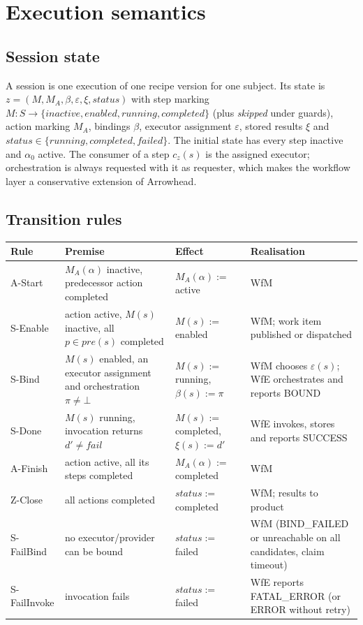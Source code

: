 \documentclass[a4paper]{arrowhead}
\begin{document}
\section{Execution semantics}
\label{sec:semantics}
\subsection{Session state}
A session is one execution of one recipe version for one subject. Its state is
$z = (M, M_A, \beta, \varepsilon, \xi, status)$ with step marking $M: S \rightarrow \{inactive, enabled, running,
completed\}$ (plus \emph{skipped} under guards), action marking $M_A$, bindings $\beta$, executor assignment
$\varepsilon$, stored results $\xi$ and $status \in \{running, completed, failed\}$. The initial state has every step
inactive and $\alpha_0$ active. The consumer of a step $c_z(s)$ is the assigned executor; orchestration is always
requested with it as requester, which makes the workflow layer a conservative extension of Arrowhead.

\subsection{Transition rules}

{\small
\begin{longtable}{|p{2.0cm}|p{5.4cm}|p{3.6cm}|p{4.8cm}|}

\hline
\rowcolor{gray!33} Rule & Premise & Effect & Realisation \\ \hline
\endhead
A-Start & $M_A(\alpha)$ inactive, predecessor action completed & $M_A(\alpha) :=$ active & WfM \\ \hline
S-Enable & action active, $M(s)$ inactive, all $p \in pre(s)$ completed & $M(s) :=$ enabled & WfM; work item published or dispatched \\ \hline
S-Bind & $M(s)$ enabled, an executor assignment and orchestration $\pi \neq \bot$ & $M(s) :=$ running, $\beta(s) := \pi$ & WfM chooses $\varepsilon(s)$; WfE orchestrates and reports BOUND \\ \hline
S-Done & $M(s)$ running, invocation returns $d' \neq fail$ & $M(s) :=$ completed, $\xi(s) := d'$ & WfE invokes, stores and reports SUCCESS \\ \hline
A-Finish & action active, all its steps completed & $M_A(\alpha) :=$ completed & WfM \\ \hline
Z-Close & all actions completed & $status :=$ completed & WfM; results to product \\ \hline
S-FailBind & no executor/provider can be bound & $status :=$ failed & WfM (BIND\_FAILED or unreachable on all candidates, claim timeout) \\ \hline
S-FailInvoke & invocation fails & $status :=$ failed & WfE reports FATAL\_ERROR (or ERROR without retry) \\ \hline
\end{longtable}
}
\end{document}
